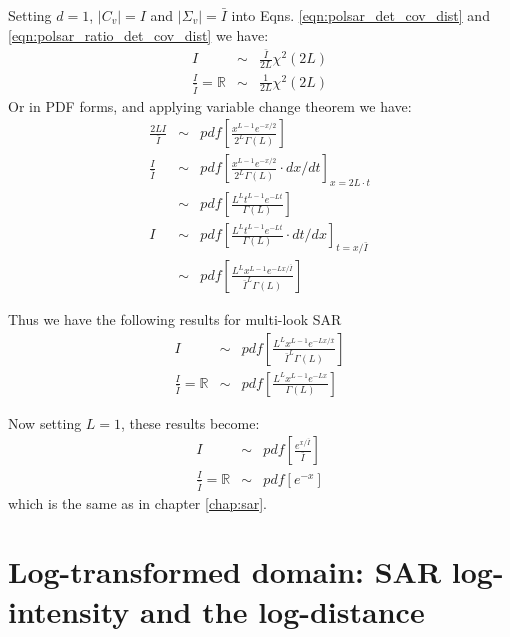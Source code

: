 Setting $d=1$, $|C_v|=I$ and $|\Sigma_v|=\bar{I}$ into Eqns. \ref{eqn:polsar_det_cov_dist} and \ref{eqn:polsar_ratio_det_cov_dist}
we have:
\begin{eqnarray*}
  I &\sim& \frac{\bar{I}}{2L} \chi^2(2L)  \\
  \frac{I}{\bar{I}} = \mathbb{R} &\sim& \frac{1}{2L}  \chi^2(2L)   
\end{eqnarray*}
Or in PDF forms, and applying variable change theorem we have:
\begin{eqnarray*}
    \frac{2L I}{\bar{I}} &\sim& pdf \left[ \frac{x^{L-1}e^{-x/2}}{2^L \Gamma(L)} \right] \\
  \frac{I}{\bar{I}} &\sim& pdf \left[ \frac{x^{L-1}e^{-x/2}}{2^L \Gamma(L)} \cdot dx/dt \right]_{x=2L \cdot t} \\
    &\sim& pdf \left[ \frac{ L^{L} t^{L-1} e^{-Lt}}{ \Gamma(L)} \right] \\
  I &\sim& pdf \left[ \frac{ L^{L} t^{L-1} e^{-Lt}}{ \Gamma(L)} \cdot dt/dx \right]_{t=x/\bar{I}}  \\
    &\sim& pdf \left[ \frac{ L^{L} x^{L-1} e^{-Lx/\bar{I}}}{ \bar{I}^{L}\Gamma(L)} \right]
\end{eqnarray*}

Thus we have the following results for multi-look SAR
\begin{eqnarray}
    I &\sim& pdf \left[ \frac{ L^{L} x^{L-1} e^{-Lx/\bar{x}}}{ \bar{I}^{L}\Gamma(L)} \right] \label{eqn:multi_look_SAR_intensity_dist} \\
    \frac{I}{\bar{I}} = \mathbb{R} &\sim& pdf \left[ \frac{ L^{L} x^{L-1} e^{-Lx}}{ \Gamma(L)} \label{eqn:multi_look_SAR_ratio_dist} \right] 
\end{eqnarray}

Now setting $L=1$, these results become:
\begin{eqnarray}
    I &\sim& pdf \left[ \frac{ e^{x/\bar{I}}}{ \bar{I}} \right] \\
    \frac{I}{\bar{I}} = \mathbb{R} &\sim& pdf \left[ e^{-x} \right] 
\end{eqnarray}
which is the same as in chapter \ref{chap:sar}.

\section{Log-transformed domain: SAR log-intensity and the log-distance}

